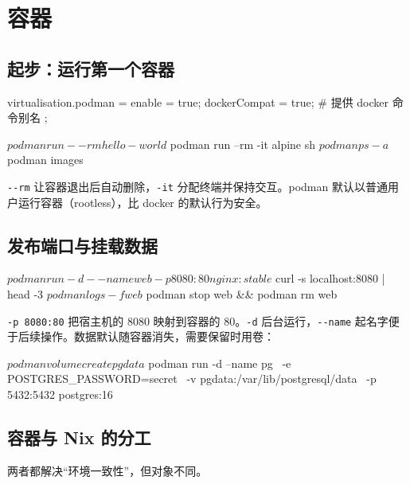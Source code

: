 \chapter{容器}

\section{起步：运行第一个容器}

\begin{nixcode}
virtualisation.podman = {
  enable = true;
  dockerCompat = true;    # 提供 docker 命令别名
};
\end{nixcode}

\begin{shellsession}
$ podman run --rm hello-world
$ podman run --rm -it alpine sh
$ podman ps -a
$ podman images
\end{shellsession}

\texttt{-{}-rm} 让容器退出后自动删除，\texttt{-it} 分配终端并保持交互。podman 默认以普通用户运行容器（rootless），比 docker 的默认行为安全。

\section{发布端口与挂载数据}

\begin{shellsession}
$ podman run -d --name web -p 8080:80 nginx:stable
$ curl -s localhost:8080 | head -3
$ podman logs -f web
$ podman stop web && podman rm web
\end{shellsession}

\texttt{-p 8080:80} 把宿主机的 8080 映射到容器的 80。\texttt{-d} 后台运行，\texttt{-{}-name} 起名字便于后续操作。数据默认随容器消失，需要保留时用卷：

\begin{shellsession}
$ podman volume create pgdata
$ podman run -d --name pg \
    -e POSTGRES_PASSWORD=secret \
    -v pgdata:/var/lib/postgresql/data \
    -p 5432:5432 postgres:16
\end{shellsession}

\section{容器与 Nix 的分工}

两者都解决“环境一致性”，但对象不同。

